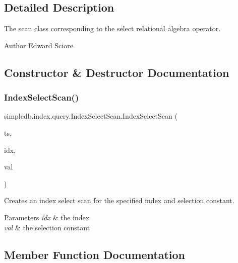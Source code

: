 \subsection{Detailed Description}
The scan class corresponding to the select relational algebra operator. \begin{DoxyAuthor}{Author}
Edward Sciore 
\end{DoxyAuthor}


\subsection{Constructor \& Destructor Documentation}
\mbox{\label{classsimpledb_1_1index_1_1query_1_1IndexSelectScan_a5295fb74f4f980e11d1c68c4a046dbb7}} 
\subsubsection{\texorpdfstring{Index\+Select\+Scan()}{IndexSelectScan()}}
{\footnotesize\ttfamily simpledb.\+index.\+query.\+Index\+Select\+Scan.\+Index\+Select\+Scan (\begin{DoxyParamCaption}\item[{\hyperlink{classsimpledb_1_1record_1_1TableScan}{Table\+Scan}}]{ts,  }\item[{\hyperlink{interfacesimpledb_1_1index_1_1Index}{Index}}]{idx,  }\item[{\hyperlink{classsimpledb_1_1query_1_1Constant}{Constant}}]{val }\end{DoxyParamCaption})\hspace{0.3cm}{\ttfamily [inline]}}

Creates an index select scan for the specified index and selection constant. 
\begin{DoxyParams}{Parameters}
{\em idx} & the index \\
\hline
{\em val} & the selection constant \\
\hline
\end{DoxyParams}


\subsection{Member Function Documentation}
\mbox{\label{classsimpledb_1_1index_1_1query_1_1IndexSelectScan_a4d7ce96f840cfc13840b3dcbee65801a}} 
